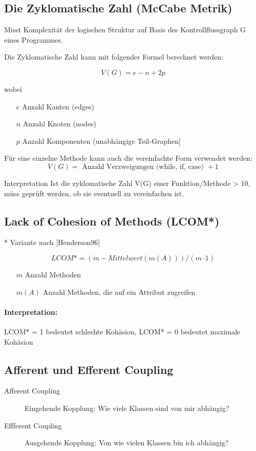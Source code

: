 
\subsection{Die Zyklomatische Zahl (McCabe Metrik)}

Misst Komplexität der logischen Struktur auf Basis des Kontrollflussgraph G eines Programmes.

Die Zyklomatische Zahl kann mit folgender Formel berechnet werden:

\[
	V(G) = e - n + 2p
\]

wobei

\begin{itemize}[label=""]
	\item[$e$] Anzahl Kanten (edges)
	\item[$n$] Anzahl Knoten (nodes)
	\item[$p$] Anzahl Komponenten (unabhängige Teil-Graphen]
\end{itemize}


Für eine einzelne Methode kann auch die vereinfachte Form verwendet werden: 
\[V(G) = \text{ Anzahl Verzweigungen (while, if, case) } + 1\]


\begin{remember}{Interpretation}{}
Ist die zyklomatische Zahl V(G) einer Funktion/Methode > 10, müss geprüft werden, ob sie eventuell zu vereinfachen ist.
\end{remember}


\subsection{Lack of Cohesion of Methods (LCOM*)}
* Variante nach [Henderson96]

\[
LCOM* = ( m - Mittelwert (m(A)) ) / ( m – 1)
\]


\begin{itemize}[label=""]
	\item[$m$] Anzahl Methoden
	\item[$m(A)$] Anzahl Methoden, die auf ein Attribut zugreifen
\end{itemize}

\paragraph{Interpretation:} LCOM* = 1 bedeutet schlechte Kohäsion, LCOM* = 0 bedeutet maximale Kohäsion


\subsection{Afferent und Efferent Coupling}
\begin{description}
	\item[Afferent Coupling] Eingehende Kopplung: Wie viele Klassen sind von mir abhängig? 
	\item[Effferent Coupling] Ausgehende Kopplung: Von wie vielen Klassen bin ich abhängig?
\end{description}

